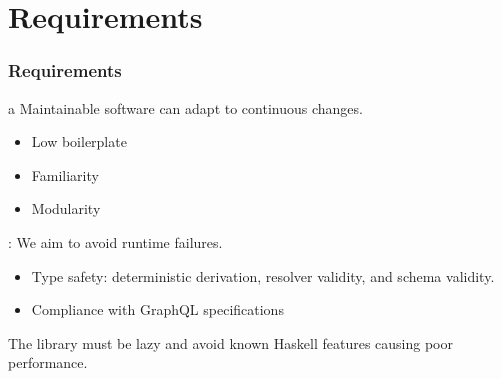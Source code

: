 \section{Requirements}

\begin{frame}\frametitle{Requirements}  

\begin{itemize}
     a Maintainable software can adapt to continuous changes.
    \begin{itemize}
        \item Low boilerplate
        \item Familiarity
        \item Modularity
    \end{itemize}
    : We aim to avoid runtime failures. 
    \begin{itemize}
        \item Type safety: deterministic derivation, resolver validity, and schema validity.    
        \item Compliance with GraphQL specifications
    \end{itemize}
     The library must be lazy and avoid known Haskell features causing poor performance.
\end{itemize}

\end{frame}